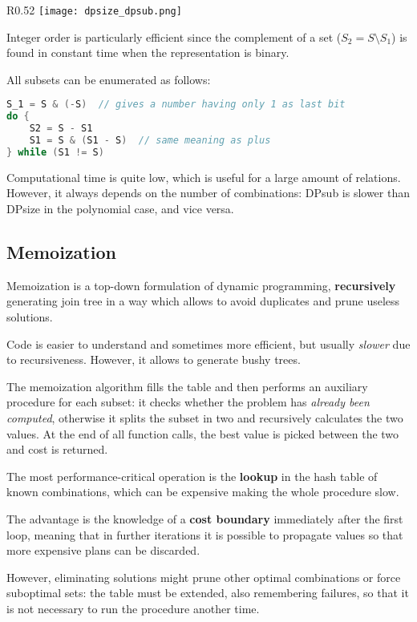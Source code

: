 \begin{wrapfigure}{R}{0.52\textwidth}
	\vspace{-27pt}
	\texttt{[image: dpsize\_dpsub.png]}
	\vspace{-100pt}
\end{wrapfigure}

Integer order is particularly efficient since the complement of a set ($S_2 = S \setminus S_1$) is found in constant time when the representation is binary.

All subsets can be enumerated as follows:
\begin{lstlisting}[language=C++]	S_1 = S & (-S)  // gives a number having only 1 as last bit
do {
	S2 = S - S1
	S1 = S & (S1 - S)  // same meaning as plus
} while (S1 != S)
\end{lstlisting}

Computational time is quite low, which is useful for a large amount of relations. However, it always depends on the number of combinations: DPsub is slower than DPsize in the polynomial case, and vice versa.

\subsection{Memoization}
Memoization is a top-down formulation of dynamic programming, \textbf{recursively} generating join tree in a way which allows to avoid duplicates and prune useless solutions.

Code is easier to understand and sometimes more efficient, but usually \textit{slower} due to recursiveness. However, it allows to generate bushy trees.

The memoization algorithm fills the table and then performs an auxiliary procedure for each subset: it checks whether the problem has \textit{already been computed}, otherwise it splits the subset in two and recursively calculates the two values. At the end of all function calls, the best value is picked between the two and cost is returned. 

The most performance-critical operation is the \textbf{lookup} in the hash table of known combinations, which can be expensive making the whole procedure slow.

The advantage is the knowledge of a \textbf{cost boundary} immediately after the first loop, meaning that in further iterations it is possible to propagate values so that more expensive plans can be discarded.

However, eliminating solutions might prune other optimal combinations or force suboptimal sets: the table must be extended, also remembering failures, so that it is not necessary to run the procedure another time.

